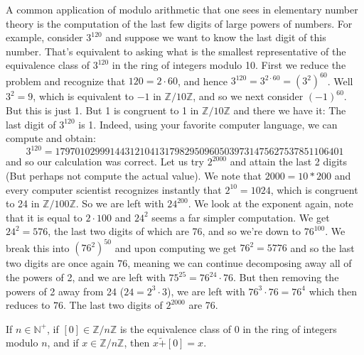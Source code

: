     \begin{example}
        A common application of modulo arithmetic that one sees in
        elementary number theory is the computation of the last few
        digits of large powers of numbers. For example, consider $3^120$
        and suppose we want to know the last digit of this number.
        That's equivalent to asking what is the smallest representative
        of the equivalence class of $3^{120}$ in the ring of integers
        modulo 10. First we reduce the problem and recognize that
        $120=2\cdot{60}$, and hence
        $3^{120}=3^{2\cdot{60}}=(3^{2})^{60}$. Well $3^{2}=9$, which
        is equivalent to $\minus{1}$ in $\mathbb{Z}/10\mathbb{Z}$, and
        so we next consider $(\minus{1})^{60}$. But this is just 1.
        But 1 is congruent to 1 in $\mathbb{Z}/10\mathbb{Z}$ and there
        we have it: The last digit of $3^{120}$ is 1. Indeed, using your
        favorite computer language, we can compute and obtain:
        \begin{equation*}
            3^{120}=
            1797010299914431210413179829509605039731475627537851106401
        \end{equation*}
        and so our calculation was correct. Let us try $2^{2000}$ and
        attain the last 2 digits (But perhaps not compute the actual
        value). We note that $2000=10*200$ and every computer scientist
        recognizes instantly that $2^{10}=1024$, which is congruent to
        24 in $\mathbb{Z}/100\mathbb{Z}$. So we are left with
        $24^{200}$. We look at the exponent again, note that it is equal
        to $2\cdot{100}$ and $24^{2}$ seems a far simpler computation.
        We get $24^{2}=576$, the last two digits of which are 76, and so
        we're down to $76^{100}$. We break this into $(76^{2})^{50}$ and
        upon computing we get $76^{2}=5776$ and so the last two digits
        are once again 76, meaning we can continue decomposing away all
        of the powers of 2, and we are left with
        $75^{25}=76^{24}\cdot{76}$. But then removing the powers of 2
        away from 24 ($24=2^{3}\cdot{3}$), we are left with
        $76^{3}\cdot{76}=76^{4}$ which then reduces to $76$. The last
        two digits of $2^{2000}$ are 76.
    \end{example}
    \begin{theorem}
        \label{thm:Equiv_Class_of_0_is_Add_Identity_Mod_n}%
        If $n\in\mathbb{N}^{+}$, if $[0]\in\mathbb{Z}/n\mathbb{Z}$ is
        the equivalence class of 0 in the ring of integers modulo $n$,
        and if $x\in\mathbb{Z}/n\mathbb{Z}$, then $x\tilde{+}[0]=x$.
    \end{theorem}
